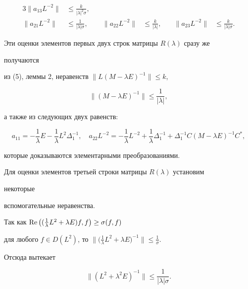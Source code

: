 \begin{pf}
\begin{alignat*}{3}
\|a_{13}L^{-2}\| &\le \frac{k}{|\lambda|^2\sigma}, \\ 


% 


\|a_{21}L^{-2}\|&\le \frac{1}{|\lambda|\sigma}, &\quad 


\|a_{22}L^{-2}\|&\le \frac{k}{|\lambda|}, &\quad 


\|a_{23}L^{-2}\|&\le \frac{k}{|\lambda|\sigma}. 


\end{alignat*} 


Эти оценки элементов первых двух строк матрицы $R(\lambda)$ сразу же 


получаются 


из (5), леммы 2, неравенств $\|L(M-\lambda E)^{-1}\|\le k$, 


\begin{equation} 


\|(M-\lambda E)^{-1}\|\le\frac{1}{|\lambda|}, 


\end{equation} 


а также из следующих двух равенств: 


$$ 


a_{11}=-\frac{1}{\lambda}E-\frac{1}{\lambda}L^2 


\Delta^{-1}_1,\quad a_{22}L^{-2}=-\frac{1}{\lambda}L^{-2} 


+\frac{1}{\lambda}\Delta^{-1}_1+\Delta^{-1}_1 


C(M-\lambda E)^{-1}C^*, 


$$ 


которые доказываются элементарными преобразованиями. 


Для оценки элементов третьей строки матрицы $R(\lambda)$ установим 


некоторые 


вспомогательные неравенства. 


Так как $\operatorname{Re}\big((\frac{1}{\lambda}L^2+\lambda E)f,f\big)\ge \sigma(f,f)$ 


для любого $f\in D(L^2)$, то $\big\|\big(\frac{1}{\lambda} L^2+\lambda 


E\big)^{-1}\big\|\le\frac{1}{\sigma}$. 


Отсюда вытекает 


\begin{equation} 


\|(L^2+\lambda^2E)^{-1}\|\le\frac{1}{|\lambda|\sigma}. 


\end{equation} 



\end{pf}
